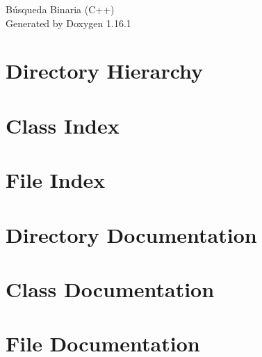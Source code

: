 \documentclass[twoside]{book}
\newcommand{\+}{\discretionary{\mbox{\scriptsize$\hookleftarrow$}}{}{}}
\newcommand{\clearemptydoublepage}{%
    \newpage{\pagestyle{empty}\cleardoublepage}%
  }
\begin{document}
  \raggedbottom
    \hypersetup{pageanchor=false,
                bookmarksnumbered=true,
                pdfencoding=unicode
               }
  \begin{titlepage}
  \vspace*{7cm}
  \begin{center}%
  {\Large Búsqueda Binaria (\+C++)}\\
  \vspace*{1cm}
  {\large Generated by Doxygen 1.16.1}\\
  \end{center}
  \end{titlepage}
  \clearemptydoublepage
  \tableofcontents
  \clearemptydoublepage
  \hypersetup{pageanchor=true}




\chapter{Directory Hierarchy}

\chapter{Class Index}

\chapter{File Index}

\chapter{Directory Documentation}


\chapter{Class Documentation}

\chapter{File Documentation}







  \backmatter
  \newpage
  \clearemptydoublepage
  \printindex
\end{document}

